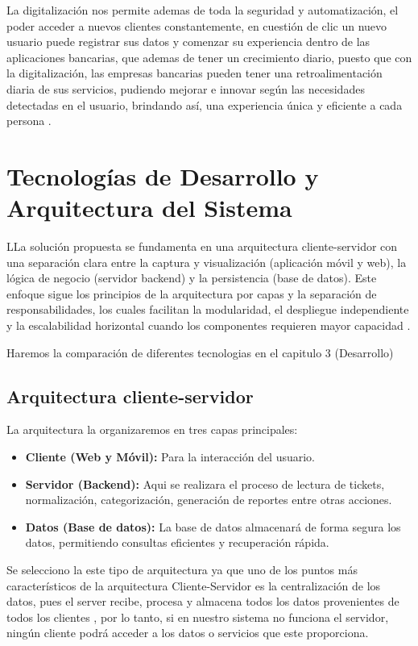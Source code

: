 La digitalización nos permite ademas de toda la seguridad y automatización, el poder acceder a nuevos clientes constantemente, en cuestión de clic un nuevo usuario puede registrar sus datos y comenzar su experiencia dentro de las aplicaciones bancarias, que ademas de tener un crecimiento diario, puesto que con la digitalización, las empresas bancarias pueden tener una retroalimentación diaria de sus servicios, pudiendo mejorar e innovar según las necesidades detectadas en el usuario, brindando así, una experiencia única y eficiente a cada persona \cite{IBM Banca}.


\section{Tecnologías de Desarrollo y Arquitectura del Sistema}
LLa solución propuesta se fundamenta en una arquitectura cliente-servidor con una separación clara entre la captura y visualización (aplicación móvil y web), la lógica de negocio (servidor backend) y la persistencia (base de datos). 
Este enfoque sigue los principios de la arquitectura por capas y la separación de responsabilidades, los cuales facilitan la modularidad, el despliegue independiente y la escalabilidad horizontal cuando los componentes requieren mayor capacidad \cite{FowlerArchStyles}.

Haremos la comparación de diferentes tecnologias en el capitulo 3 (Desarrollo)

\subsection{Arquitectura cliente-servidor}
La arquitectura la organizaremos en tres capas principales:
\begin{itemize}
    \item \textbf{Cliente (Web y Móvil):} Para la interacción del usuario.
    \item \textbf{Servidor (Backend):} Aqui se realizara el proceso de lectura de tickets, normalización, categorización, generación de reportes entre otras acciones.
    \item \textbf{Datos (Base de datos):} La base de datos almacenará de forma segura los datos, permitiendo consultas eficientes y recuperación rápida.
\end{itemize}

Se selecciono la este tipo de arquitectura ya que uno de los puntos más característicos de la arquitectura Cliente-Servidor es la centralización de los datos, pues el server recibe, 
procesa y almacena todos los datos provenientes de todos los clientes \cite{ClienteServidor}, por lo tanto, si en nuestro sistema no funciona el servidor, ningún cliente podrá acceder a los datos o 
servicios que este proporciona. 

